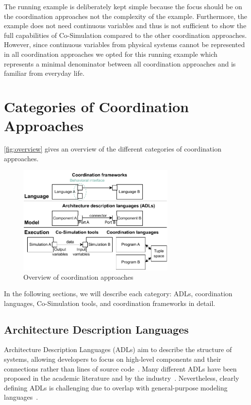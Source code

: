 \documentclass[runningheads]{llncs}
\begin{document}
The running example is deliberately kept simple because the focus should be on the coordination approaches not the complexity of the example.
Furthermore, the example does not need continuous variables and thus is not sufficient to show the full capabilities of Co-Simulation compared to the other coordination approaches.
However, since continuous variables from physical systems cannot be represented in all coordination approaches we opted for this running example which represents a minimal denominator between all coordination approaches and is familiar from everyday life.

\section{Categories of Coordination Approaches} \label{sec:approaches}

\autoref{fig:overview} gives an overview of the different categories of coordination approaches.

\begin{figure}[ht]
	\centering
	\includegraphics[width=0.7\textwidth]{images/overview}
	\caption{Overview of coordination approaches}
	\label{fig:overview}
\end{figure}

In the following sections, we will describe each category: ADLs, coordination languages, Co-Simulation tools, and coordination frameworks in detail.

\subsection{Architecture Description Languages}
Architecture Description Languages (ADLs) aim to describe the structure of systems, allowing developers to focus on high-level components and their connections rather than lines of source code~\cite{clementsSurveyArchitectureDescription1996,medvidovicClassificationComparisonFramework2000,medvidovicFrameworkClassifyingComparing1997}.
Many different ADLs have been proposed in the academic literature and by the industry~\cite{medvidovicClassificationComparisonFramework2000,woodsArchitectureDescriptionLanguages2005}.
Nevertheless, clearly defining ADLs is challenging due to overlap with general-purpose modeling languages~\cite{clementsSurveyArchitectureDescription1996}.
\end{document}
